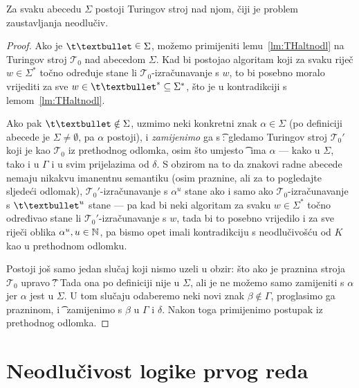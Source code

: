 \begin{propozicija}
Za svaku abecedu $\Sigma$ postoji Turingov stroj nad njom, čiji je problem zaustavljanja neodlučiv.
\end{propozicija}
\begin{proof}
Ako je $\t\textbullet\;\raisebox{1.1pt}{$\in$}\;\Sigma$, možemo primijeniti lemu~\ref{lm:THaltnodl} na Turingov stroj $\mathcal T_0$ nad abecedom $\Sigma$. Kad bi postojao algoritam koji za svaku riječ $w\in\Sigma^*$ točno određuje stane li $\mathcal T_0$-izračunavanje s $w$, to bi posebno moralo vrijediti za sve $w\in\t\textbullet^*\subseteq\Sigma^*$, što je u kontradikciji s lemom~\ref{lm:THaltnodl}.

Ako pak $\t\textbullet\notin\Sigma$, uzmimo neki konkretni znak $\alpha\in\Sigma$ (po definiciji abecede je $\Sigma\ne\emptyset$, pa $\alpha$ postoji), i \emph{zamijenimo} ga s \t\textbullet: gledamo Turingov stroj $\mathcal T_0'$ koji je kao $\mathcal T_0$ iz prethodnog odlomka, osim što umjesto \t\textbullet\ ima $\alpha$ --- kako u $\Sigma$, tako i u $\Gamma$ i u svim prijelazima od $\delta$. S obzirom na to da znakovi radne abecede nemaju nikakvu imanentnu semantiku (osim praznine, ali za to pogledajte sljedeći odlomak), $\mathcal T_0'$-izračunavanje s $\alpha^u$ stane ako i samo ako $\mathcal T_0$-izračunavanje s $\t\textbullet^u$ stane --- pa kad bi neki algoritam za svaku $w\in\Sigma^*$ točno određivao stane li $\mathcal T_0'$-izračunavanje s $w$, tada bi to posebno vrijedilo i za sve riječi oblika $\alpha^u,u\in{\mathbb N}$, pa bismo opet imali kontradikciju s neodlučivošću od $K$ kao u prethodnom odlomku.

Postoji još samo jedan slučaj koji nismo uzeli u obzir: što ako je praznina stroja $\mathcal T_0$ upravo \t\textbullet? Tada ona po definiciji nije u $\Sigma$, ali je ne možemo samo zamijeniti s $\alpha$ jer $\alpha$ jest u $\Sigma$. U tom slučaju odaberemo neki novi znak $\beta\notin\Gamma$, proglasimo ga prazninom, i \t\textbullet\ zamijenimo s $\beta$ u $\Gamma$ i $\delta$. Nakon toga primijenimo postupak iz prethodnog odlomka.
\end{proof}

\section{Neodlučivost logike prvog reda}

